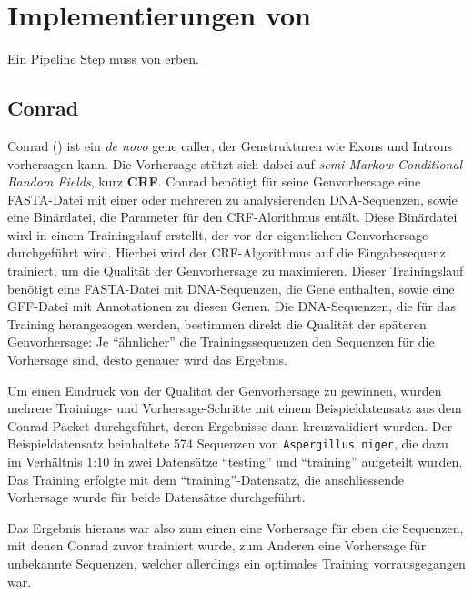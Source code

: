 \section{Implementierungen von }
Ein Pipeline Step muss von  erben.
\subsection{Conrad}
Conrad
()
ist ein \textit{de novo} gene caller, der Genstrukturen wie Exons und Introns
vorhersagen kann.
 
Die Vorhersage stützt sich dabei auf \textit{semi-Markow Conditional Random
Fields}, kurz \textbf{CRF}.  %
  
Conrad benötigt für seine Genvorhersage eine FASTA-Datei mit einer oder
mehreren zu analysierenden DNA-Sequenzen, sowie eine Binärdatei, die Parameter
für den CRF-Alorithmus entält.
Diese Binärdatei wird in einem Trainingslauf erstellt, der vor der
eigentlichen Genvorhersage durchgeführt wird. Hierbei wird der CRF-Algorithmus
auf die Eingabesequenz trainiert, um die Qualität der Genvorhersage
zu maximieren. Dieser Trainingslauf benötigt eine FASTA-Datei mit
DNA-Sequenzen, die Gene enthalten, sowie eine GFF-Datei mit Annotationen zu
diesen Genen.
Die DNA-Sequenzen, die für das Training herangezogen werden, bestimmen direkt
die Qualität der späteren Genvorhersage:
Je \enquote{ähnlicher} die Trainingssequenzen den Sequenzen für die
Vorhersage sind, desto genauer wird das Ergebnis.
\citep{doherty_gene_2007}

Um einen Eindruck von der Qualität der Genvorhersage zu gewinnen, wurden
mehrere Trainings- und Vorhersage-Schritte mit einem Beispieldatensatz aus dem
Conrad-Packet durchgeführt, deren Ergebnisse dann kreuzvalidiert wurden.
Der Beispieldatensatz beinhaltete 574 Sequenzen von \texttt{Aspergillus niger},
die dazu im Verhältnis 1:10 in zwei Datensätze \enquote{testing} und
\enquote{training} aufgeteilt wurden. Das Training erfolgte mit dem
\enquote{training}-Datensatz, die anschliessende Vorhersage wurde für beide
Datensätze durchgeführt.

Das Ergebnis hieraus war also zum einen eine Vorhersage für eben die Sequenzen,
mit denen Conrad zuvor trainiert wurde, zum Anderen eine Vorhersage für unbekannte
Sequenzen, welcher allerdings ein optimales Training vorrausgegangen war.

